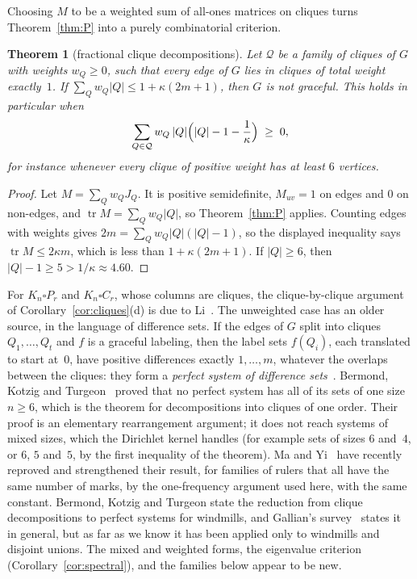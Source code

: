 \documentclass[11pt]{amsart}
\newcommand{\thmmarker}{}
\newcommand{\mnew}{\gdef\thmmarker{\textsuperscript{$\star$}}}
\theoremstyle{tplain}
\newtheorem{theorem}{Theorem}[section]
\theoremstyle{tdefinition}
\theoremstyle{tremark}
\newcommand{\tr}{\operatorname{tr}}
\begin{document}
Choosing $M$ to be a weighted sum of all-ones matrices on cliques turns
Theorem~\ref{thm:P} into a purely combinatorial criterion.

\mnew\begin{theorem}[fractional clique decompositions]\label{thm:cliquedec}
Let $\mathcal Q$ be a family of cliques of $G$ with weights $w_Q\ge0$, such that
every edge of $G$ lies in cliques of total weight exactly~$1$. If
$\sum_{Q}w_Q|Q|\le1+\kappa(2m+1)$, then $G$ is not graceful. This holds in
particular when
\[
  \sum_{Q\in\mathcal Q}w_Q\,|Q|\Bigl(|Q|-1-\frac1\kappa\Bigr)\;\ge\;0,
\]
for instance whenever every clique of positive weight has at least $6$
vertices.
\end{theorem}

\begin{proof}
Let $M=\sum_Qw_QJ_Q$. It is positive semidefinite, $M_{uv}=1$ on edges and
$0$ on non-edges, and $\tr M=\sum_Qw_Q|Q|$, so Theorem~\ref{thm:P} applies.
Counting edges with weights gives $2m=\sum_Qw_Q|Q|(|Q|-1)$, so the displayed
inequality says $\tr M\le2\kappa m$, which is less than $1+\kappa(2m+1)$. If
$|Q|\ge6$, then $|Q|-1\ge5>1/\kappa\approx4.60$.
\end{proof}

For $K_n\square P_r$ and $K_n\square C_r$, whose columns are cliques, the
clique-by-clique argument of Corollary~\ref{cor:cliques}(d) is due to
Li~\cite{knuth-err}. The unweighted case
has an older source, in the language of difference sets. If the edges of $G$
split into cliques $Q_1,\dots,Q_t$ and $f$ is a graceful labeling, then the
label sets $f(Q_i)$, each translated to start at~$0$, have positive
differences exactly $1,\dots,m$, whatever the overlaps between the cliques:
they form a \emph{perfect system of difference sets}~\cite{abrham}. Bermond,
Kotzig and Turgeon~\cite{bkt} proved that no perfect system has all of its
sets of one size $n\ge6$, which is the theorem for decompositions into
cliques of one order. Their proof is an elementary rearrangement argument; it
does not reach systems of mixed sizes, which the Dirichlet kernel handles
(for example sets of sizes $6$ and~$4$, or $6$, $5$ and~$5$, by the first
inequality of the theorem). Ma and Yi~\cite{mayi} have recently reproved and
strengthened their result, for families of rulers that all have the same
number of marks, by the one-frequency argument used here, with the same
constant. Bermond, Kotzig and Turgeon state the reduction from clique
decompositions to perfect systems for windmills, and Gallian's
survey~\cite{gallian} states it in general, but as far as we know it has been
applied only to windmills and disjoint unions. The mixed and weighted forms,
the eigenvalue criterion (Corollary~\ref{cor:spectral}), and the families
below appear to be new.
\end{document}
